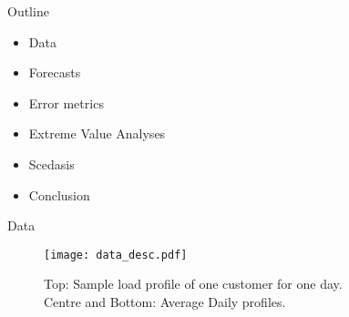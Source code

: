 \documentclass[notes]{beamer}
\begin{document}
\begin{frame}{Outline}
\begin{itemize}
\item Data
\item Forecasts
\item Error metrics
\item Extreme Value Analyses
\item Scedasis
\item Conclusion
\end{itemize}
\end{frame}


\begin{frame}{Data}
\begin{figure}
\centering
\texttt{[image: data\_desc.pdf]}
\caption{Top: Sample load profile of one customer for one day.\\ Centre and Bottom: Average Daily profiles.}
\label{fig:sums} 
\end{figure}
\end{frame}

\end{document}
